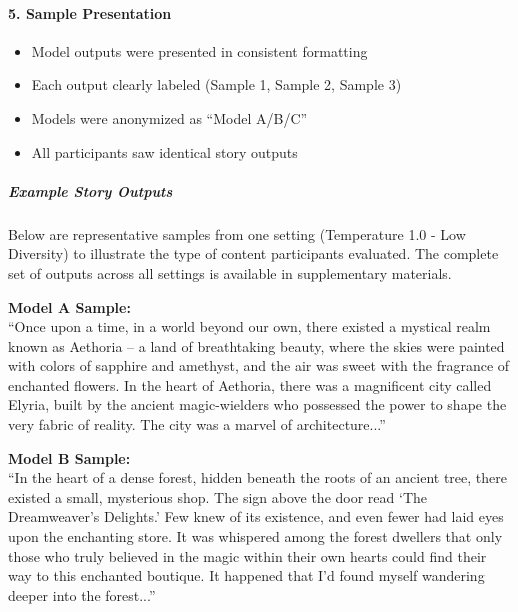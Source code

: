 \documentclass{article}
\begin{document}
\paragraph{5. Sample Presentation}
\begin{itemize}
    \item Model outputs were presented in consistent formatting
    \item Each output clearly labeled (Sample 1, Sample 2, Sample 3)
    \item Models were anonymized as ``Model A/B/C''
    \item All participants saw identical story outputs
\end{itemize}

\subparagraph{Example Story Outputs}
Below are representative samples from one setting (Temperature 1.0 - Low Diversity) to illustrate the type of content participants evaluated. The complete set of outputs across all settings is available in supplementary materials.

\begin{tcolorbox}[
    colback=white,
    colframe=black,
    boxrule=0.5pt,
    arc=0pt,
    left=6pt,
    right=6pt,
    top=6pt,
    bottom=6pt
]
\noindent\textbf{Model A Sample:}\\
``Once upon a time, in a world beyond our own, there existed a mystical realm known as Aethoria -- a land of breathtaking beauty, where the skies were painted with colors of sapphire and amethyst, and the air was sweet with the fragrance of enchanted flowers. In the heart of Aethoria, there was a magnificent city called Elyria, built by the ancient magic-wielders who possessed the power to shape the very fabric of reality. The city was a marvel of architecture...''
\end{tcolorbox}

\begin{tcolorbox}[
    colback=white,
    colframe=black,
    boxrule=0.5pt,
    arc=0pt,
    left=6pt,
    right=6pt,
    top=6pt,
    bottom=6pt
]
\noindent\textbf{Model B Sample:}\\
``In the heart of a dense forest, hidden beneath the roots of an ancient tree, there existed a small, mysterious shop. The sign above the door read `The Dreamweaver's Delights.' Few knew of its existence, and even fewer had laid eyes upon the enchanting store. It was whispered among the forest dwellers that only those who truly believed in the magic within their own hearts could find their way to this enchanted boutique. It happened that I'd found myself wandering deeper into the forest...''
\end{tcolorbox}
\end{document}
